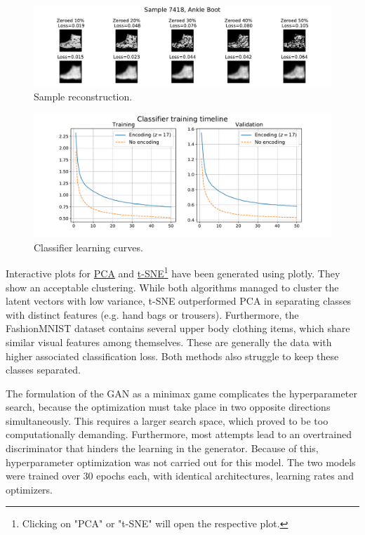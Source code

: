 \documentclass[11pt]{article} %
\begin{document}
\begin{figure}[t]
    \centering
    \includegraphics[width=\textwidth]{res/Reconstruction.pdf}
    \caption{Sample reconstruction.}
    \label{fig:recon}
\end{figure}

\begin{figure}[t]
    \centering
    \includegraphics[width=\textwidth]{res/classifier_lcurve.pdf}
    \caption{Classifier learning curves.}
    \label{fig:classifier}
\end{figure}

Interactive plots for \href{run:res/pca_plot.html}{PCA} and \href{run:res/tsne_plot.html}{t-SNE}\footnote{Clicking on "PCA" or "t-SNE" will open the respective plot.} have been generated using plotly. They show an acceptable clustering. While both algorithms managed to cluster the latent vectors with low variance, t-SNE outperformed PCA in separating classes with distinct features (e.g. hand bags or trousers). Furthermore, the FashionMNIST dataset contains several upper body clothing items, which share similar visual features among themselves. These are generally the data with higher associated classification loss. Both methods also struggle to keep these classes separated.

\pagebreak

The formulation of the GAN as a minimax game complicates the hyperparameter search, because the optimization must take place in two opposite directions simultaneously. This requires a larger search space, which proved to be too computationally demanding. Furthermore, most attempts lead to an overtrained discriminator that hinders the learning in the generator. Because of this, hyperparameter optimization was not carried out for this model. The two models were trained over 30 epochs each, with identical architectures, learning rates and optimizers.
\end{document}
